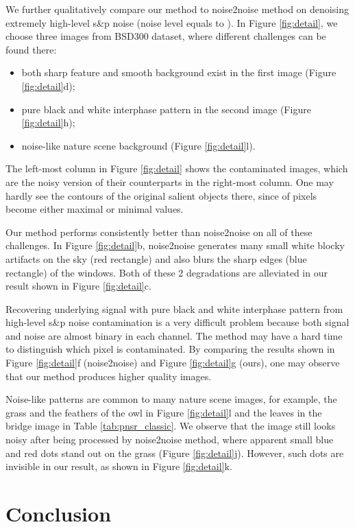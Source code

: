 \documentclass[journal]{IEEEtran}
\begin{document}
We further qualitatively compare our method to noise2noise method \cite{Lehtinen2018} on denoising extremely high-level s\&p noise (noise level equals to ). In Figure \ref{fig:detail}, we choose three images from BSD300 dataset, where different challenges can be found there:
\begin{itemize}
  \item both sharp feature and smooth background exist in the first image (Figure \ref{fig:detail}d);
  \item pure black and white interphase pattern in the second image (Figure \ref{fig:detail}h);
  \item noise-like nature scene background (Figure \ref{fig:detail}l).
\end{itemize}
The left-most column in Figure \ref{fig:detail} shows the contaminated images, which are the noisy version of their counterparts in the right-most column. One may hardly see the contours of the original salient objects there, since  of pixels become either maximal or minimal values.

Our method performs consistently better than noise2noise on all of these challenges. In Figure \ref{fig:detail}b, noise2noise generates many small white blocky artifacts on the sky (red rectangle) and also blurs the sharp edges (blue rectangle) of the windows. Both of these 2 degradations are alleviated in our result shown in Figure \ref{fig:detail}c.

Recovering underlying signal with pure black and white interphase pattern from high-level s\&p noise contamination is a very difficult problem because both signal and noise are almost binary in each channel. The method may have a hard time to distinguish which pixel is contaminated. By comparing the results shown in Figure \ref{fig:detail}f (noise2noise) and Figure \ref{fig:detail}g (ours), one may observe that our method produces higher quality images.

Noise-like patterns are common to many nature scene images, for example, the grass and the feathers of the owl in Figure \ref{fig:detail}l and the leaves in the bridge image in Table \ref{tab:pnsr_classic}. We observe that the image still looks noisy after being processed by noise2noise method, where apparent small blue and red dots stand out on the grass (Figure \ref{fig:detail}j). However, such dots are invisible in our result, as shown in Figure \ref{fig:detail}k.


\section{Conclusion} \label{sec:conclusion}
\end{document}
